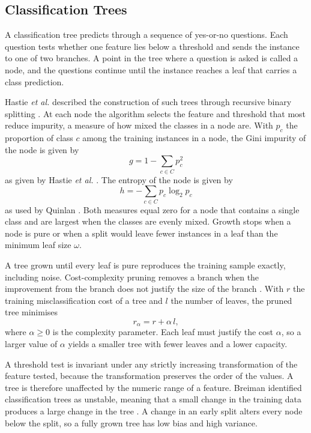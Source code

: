 \documentclass[conference]{IEEEtran}
\begin{document}
\subsection{Classification Trees}

A classification tree predicts through a sequence of yes-or-no questions. Each
question tests whether one feature lies below a threshold and sends the instance
to one of two branches. A point in the tree where a question is asked is called a
node, and the questions continue until the instance reaches a leaf that carries a
class prediction.

Hastie \textit{et al.} described the construction of such trees through recursive
binary splitting \cite{hastie2009}. At each node the algorithm selects the feature and threshold
that most reduce impurity, a measure of how mixed the classes in a node are. With
$p_c$ the proportion of class $c$ among the training instances in a node, the
Gini impurity of the node is given by
\begin{equation}
g = 1 - \sum_{c \in C} p_c^2
\end{equation}
as given by Hastie \textit{et al.} \cite{hastie2009}. The entropy of the node
is given by
\begin{equation}
h = -\sum_{c \in C} p_c \log_2 p_c
\end{equation}
as used by Quinlan \cite{quinlan1986}. Both measures equal zero for a node that
contains a single class and are largest when the classes are evenly mixed. Growth
stops when a node is pure or when a split would leave fewer instances in a leaf
than the minimum leaf size $\omega$.

A tree grown until every leaf is pure reproduces the training sample exactly,
including noise. Cost-complexity pruning removes a branch when the improvement
from the branch does not justify the size of the branch \cite{hastie2009}. With
$r$ the training misclassification cost of a tree and $l$ the number of leaves,
the pruned tree minimises
\begin{equation}
r_\alpha = r + \alpha\, l ,
\end{equation}
where $\alpha \geq 0$ is the complexity parameter. Each leaf must justify the cost
$\alpha$, so a larger value of $\alpha$ yields a smaller tree with fewer leaves and
a lower capacity.

A threshold test is invariant under any strictly increasing transformation of the
feature tested, because the transformation preserves the order of the values. A
tree is therefore unaffected by the numeric range of a feature. Breiman identified
classification trees as unstable, meaning that a small change in the training data
produces a large change in the tree \cite{breiman1996}. A change in an early split
alters every node below the split, so a fully grown tree has low bias and high
variance.
\end{document}
